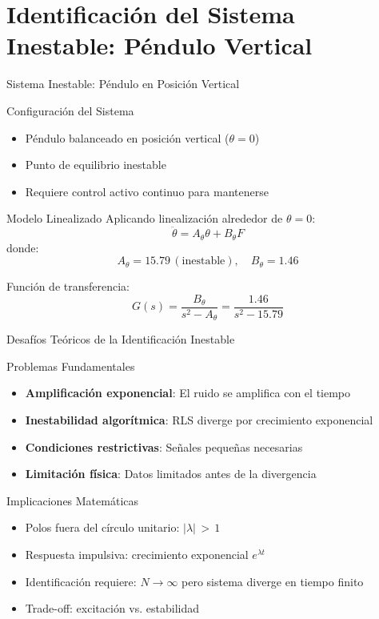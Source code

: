 \documentclass{beamer}
\begin{document}
\section{Identificación del Sistema Inestable: Péndulo Vertical}

\begin{frame}{Sistema Inestable: Péndulo en Posición Vertical}
\begin{block}{Configuración del Sistema}
\begin{itemize}
\item Péndulo balanceado en posición vertical ($\theta = 0$)
\item Punto de equilibrio inestable
\item Requiere control activo continuo para mantenerse
\end{itemize}
\end{block}

\begin{block}{Modelo Linealizado}
Aplicando linealización alrededor de $\theta = 0$:
\[
\ddot{\theta} = A_\theta \theta + B_\theta F
\]
donde:
\[
A_\theta = 15.79 \, (\text{inestable}), \quad B_\theta = 1.46
\]

Función de transferencia:
\[
G(s) = \frac{B_\theta}{s^2 - A_\theta} = \frac{1.46}{s^2 - 15.79}
\]
\end{block}
\end{frame}

\begin{frame}{Desafíos Teóricos de la Identificación Inestable}
\begin{block}{Problemas Fundamentales}
\begin{itemize}
\item \textbf{Amplificación exponencial}: El ruido se amplifica con el tiempo
\item \textbf{Inestabilidad algorítmica}: RLS diverge por crecimiento exponencial
\item \textbf{Condiciones restrictivas}: Señales pequeñas necesarias
\item \textbf{Limitación física}: Datos limitados antes de la divergencia
\end{itemize}
\end{block}

\begin{block}{Implicaciones Matemáticas}
\begin{itemize}
\item Polos fuera del círculo unitario: $|\lambda| \, > \, 1$
\item Respuesta impulsiva: crecimiento exponencial $e^{\lambda t}$
\item Identificación requiere: $N \to \infty$ pero sistema diverge en tiempo finito
\item Trade-off: excitación vs. estabilidad
\end{itemize}
\end{block}
\end{frame}
\end{document}
